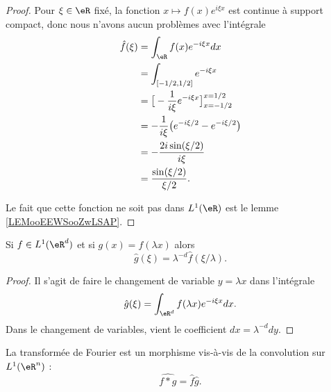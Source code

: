 \begin{proof}
	Pour \( \xi\in \eR\) fixé, la fonction \( x\mapsto f(x) e^{i\xi x}\) est continue à support compact, donc nous n'avons aucun problèmes avec l'intégrale
	\begin{subequations}
		\begin{align}
			\hat f(\xi) & =\int_{\eR}f(x) e^{-i\xi x}dx                               \\
			            & =\int_{\mathopen[ -1/2 , 1/2 \mathclose]} e^{-i\xi x}       \\
			            & =\big[ -\frac{1}{ i\xi } e^{-i\xi x} \big]_{x=-1/2}^{x=1/2} \\
			            & =-\frac{1}{ i\xi }\big(  e^{-i\xi /2}- e^{-i\xi /2} \big)   \\
			            & =-\frac{ 2i\sin(\xi/2) }{ i\xi }                            \\
			            & =\frac{ \sin(\xi/2) }{ \xi/2 }.
		\end{align}
	\end{subequations}

	Le fait que cette fonction ne soit pas dans \( L^1(\eR)\) est le lemme \ref{LEMooEEWSooZwLSAP}.
\end{proof}

\begin{lemma}       \label{LEMooKGDKooVXSMCn}
	Si \( f\in L^1(\eR^d)\) et si \( g(x)=f(\lambda x)\) alors
	\begin{equation}
		\hat g(\xi)=\lambda^{-d}\hat f(\xi/\lambda).
	\end{equation}
\end{lemma}

\begin{proof}
	Il s'agit de faire le changement de variable \( y=\lambda x\) dans l'intégrale
	\begin{equation}
		\hat g(\xi)=\int_{\eR^d}f(\lambda x) e^{-i\xi x}dx.
	\end{equation}
	Dans le changement de variables, vient le coefficient \( dx=\lambda^{-d}dy\).
\end{proof}

\begin{proposition}     \label{PropfqvLOl}
	La transformée de Fourier est un morphisme vis-à-vis de la convolution sur \( L^1(\eR^n)\) :
	\begin{equation}
		\widehat{f*g}=\hat f\hat g.
	\end{equation}
\end{proposition}

